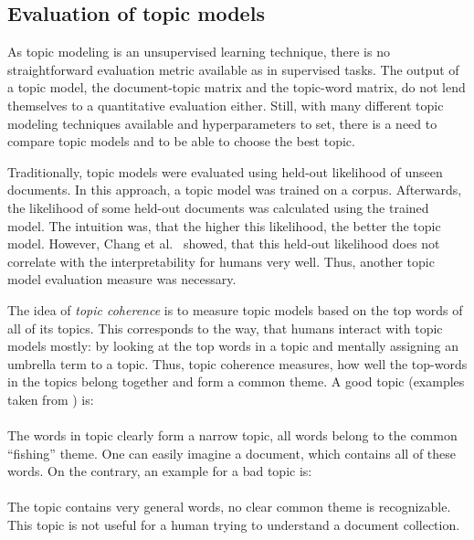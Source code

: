 \documentclass[
        a4paper,
        titlepage,
        twoside,
        parskip
        ]{scrbook}
\theoremstyle{break}
\begin{document}
\subsection{Evaluation of topic models}
As topic modeling is an unsupervised learning technique, there is no straightforward evaluation metric available as in supervised tasks.
The output of a topic model, the document-topic matrix and the topic-word matrix, do not lend themselves to a quantitative evaluation either.
Still, with many different topic modeling techniques available and hyperparameters to set, there is a need to compare topic models and to be able to choose the best topic.

Traditionally, topic models were evaluated using held-out likelihood of unseen documents.
In this approach, a topic model was trained on a corpus.
Afterwards, the likelihood of some held-out documents was calculated using the trained model.
The intuition was, that the higher this likelihood, the better the topic model.
However, Chang et al.~\cite{Chang2009} showed, that this held-out likelihood does not correlate with the interpretability for humans very well.
Thus, another topic model evaluation measure was necessary.

The idea of \emph{topic coherence} is to measure topic models based on the top words of all of its topics.
This corresponds to the way, that humans interact with topic models mostly: by looking at the top words in a topic and mentally assigning an umbrella term to a topic.
Thus, topic coherence measures, how well the top-words in the topics belong together and form a common theme.
A good topic (examples taken from \cite{Boyd-graber2014}) is: \\
\hspace*{1cm}  \\
The words in topic clearly form a narrow topic, all words belong to the common ``fishing'' theme.
One can easily imagine a document, which contains all of these words.
On the contrary, an example for a bad topic is: \\
\hspace*{1cm}  \\
The topic contains very general words, no clear common theme is recognizable.
This topic is not useful for a human trying to understand a document collection.
\end{document}
